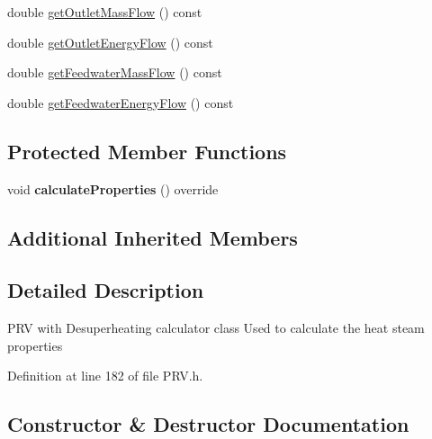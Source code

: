 \begin{DoxyCompactItemize}
\item 
double \hyperlink{class_prv_with_desuperheating_a848a898a392dd7abfb030d0ca1653454}{get\+Outlet\+Mass\+Flow} () const
\item 
double \hyperlink{class_prv_with_desuperheating_aa6e9bbb28c565ba8f7770f69ace33ab3}{get\+Outlet\+Energy\+Flow} () const
\item 
double \hyperlink{class_prv_with_desuperheating_a9bd8ee7d5b563110a7279102352b8f4d}{get\+Feedwater\+Mass\+Flow} () const
\item 
double \hyperlink{class_prv_with_desuperheating_a42945a77fcdbaf1e1844c444c696f8b0}{get\+Feedwater\+Energy\+Flow} () const
\end{DoxyCompactItemize}
\subsection*{Protected Member Functions}
\begin{DoxyCompactItemize}
\item 
\mbox{\label{class_prv_with_desuperheating_af400ed7c148f708ca087bd79228586f3}} 
void {\bfseries calculate\+Properties} () override
\end{DoxyCompactItemize}
\subsection*{Additional Inherited Members}


\subsection{Detailed Description}
P\+RV with Desuperheating calculator class Used to calculate the heat steam properties 

Definition at line 182 of file P\+R\+V.\+h.



\subsection{Constructor \& Destructor Documentation}
\mbox{\label{class_prv_with_desuperheating_adfd7f6866e8b953dcc41e51bb5b31b58}} 
